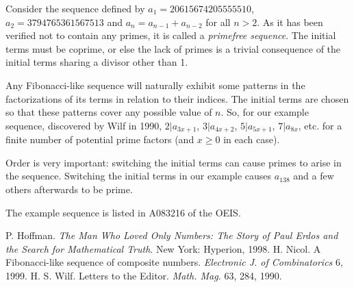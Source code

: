 \documentclass[12pt]{article}
\begin{document}

Consider the sequence defined by $a_1 = 20615674205555510$, $a_2 = 3794765361567513$ and $a_n = a_{n - 1} + a_{n - 2}$ for all $n > 2$. As it has been verified not to contain any primes, it is called a {\em primefree sequence}. The initial terms must be coprime, or else the lack of primes is a trivial consequence of the initial terms sharing a divisor other than 1.

Any Fibonacci-like sequence will naturally exhibit some patterns in the factorizations of its terms in relation to their indices. The initial terms are chosen so that these patterns cover any possible value of $n$. So, for our example sequence, discovered by Wilf in 1990, $2|a_{3x + 1}$, $3|a_{4x + 2}$, $5|a_{5x + 1}$, $7|a_{8x}$, etc. for a finite number of potential prime factors (and $x \ge 0$ in each case).

Order is very important: switching the initial terms can cause primes to arise in the sequence. Switching the initial terms in our example causes $a_{138}$ and a few others afterwards to be prime.

The example sequence is listed in A083216 of the OEIS.

\begin{thebibliography}{3}
P. Hoffman. {\it The Man Who Loved Only Numbers: The Story of Paul Erdos and the Search for Mathematical Truth}. New York: Hyperion, 1998.
H. Nicol. A Fibonacci-like sequence of composite numbers. {\it Electronic J. of Combinatorics} 6, 1999.
H. S. Wilf. Letters to the Editor. {\it Math. Mag.} 63, 284, 1990.
\end{thebibliography}
\end{document}
